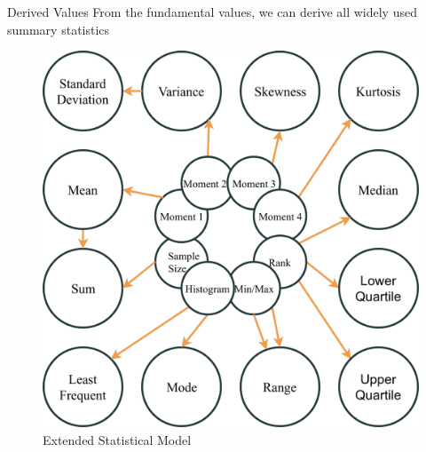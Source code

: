 \documentclass[10pt,aspectratio=169]{beamer} %
\begin{document}
\begin{frame}{Derived Values}
From the fundamental values, we can derive all widely used summary statistics
\begin{figure}
    \includegraphics[height=0.74\textheight]{Extended.png}
    \caption{Extended Statistical Model}
\end{figure}
\end{frame}
\end{document}
